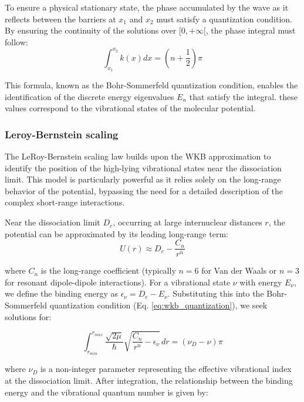 To ensure a physical stationary state, the phase accumulated by the wave as it reflects between 
the barriers at $x_1$ and $x_2$ must satisfy a quantization condition. By ensuring the continuity 
of the solutions over $[0, +\infty[$, the phase integral must follow:
\begin{equation}
    \int_{x_1}^{x_2} k(x)dx = \left(n+\frac{1}{2}\right)\pi
    \label{eq:wkb_quantization}
\end{equation}

This formula, known as the Bohr-Sommerfeld quantization condition, enables the identification of 
the discrete energy eigenvalues $E_n$ that satisfy the integral. these values correspond to the 
vibrational states of the molecular potential.

\subsubsection{Leroy-Bernstein scaling}


The LeRoy-Bernstein scaling law \cite{leroy1970dissociation} builds upon the WKB approximation to identify the position of the 
high-lying vibrational states near the dissociation limit. This model is particularly powerful as 
it relies solely on the long-range behavior of the potential, bypassing the need for a detailed 
description of the complex short-range interactions. 

Near the dissociation limit $D_e$, occurring at large internuclear distances $r$, the potential 
can be approximated by its leading long-range term:
\begin{equation}
    U(r) \approx D_e - \frac{C_n}{r^n}
\end{equation}

where $C_n$ is the long-range coefficient (typically $n=6$ for Van der Waals or $n=3$ for resonant 
dipole-dipole interactions). For a vibrational state $\nu$ with energy $E_{\nu}$, we define the 
binding energy as $\epsilon_{\nu} = D_e - E_{\nu}$. Substituting this into the Bohr-Sommerfeld 
quantization condition (Eq. \ref{eq:wkb_quantization}), we seek solutions for:

\begin{equation}
    \int_{r_{min}}^{r_{max}} \frac{\sqrt{2\mu}}{\hbar} \sqrt{\frac{C_n}{r^n} - \epsilon_{\nu}} \, dr = (\nu_D - \nu) \pi
\end{equation}

where $\nu_D$ is a non-integer parameter representing the effective vibrational index at the 
dissociation limit. After integration, the relationship between the binding energy and the 
vibrational quantum number is given by:

